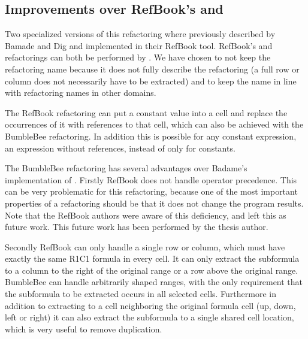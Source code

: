 \subsection{Improvements over RefBook's  and }
\label{subsubsec:improvementsextractformula}

Two specialized versions of this refactoring where previously described by Bamade and Dig \cite{badame2012refactoring} and implemented in their RefBook tool.
RefBook's  and  refactorings can both be performed by .
We have chosen to not keep the  refactoring name because it does not fully describe the refactoring (a full row or column does not necessarily have to be extracted) and to keep the name in line with refactoring names in other domains.

The RefBook  refactoring can put a constant value into a cell and replace the occurrences of it with references to that cell, which can also be achieved with the BumbleBee  refactoring.
In addition this is possible for any constant expression, an expression without references, instead of only for constants.

The BumbleBee  refactoring has several advantages over Badame's implementation of .
Firstly RefBook does not handle operator precedence.
This can be very problematic for this refactoring, because one of the most important properties of a refactoring should be that it does not change the program results.
Note that the RefBook authors were aware of this deficiency, and left this as future work.
This future work has been performed by the thesis author.

Secondly RefBook can only handle a single row or column, which must have exactly the same R1C1 formula in every cell.
It can only extract the subformula to a column to the right of the original range or a row above the original range.
BumbleBee can handle arbitrarily shaped ranges, with the only requirement that the subformula to be extracted occurs in all selected cells.
Furthermore in addition to extracting to a cell neighboring the original formula cell (up, down, left or right) it can also extract the subformula to a single shared cell location, which is very useful to remove duplication.

\section{}
\label{refac:inlineformula}

